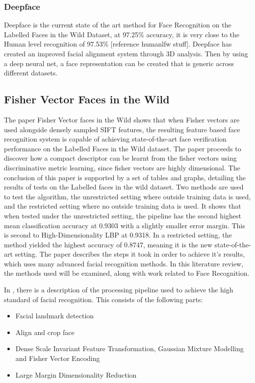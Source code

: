\documentclass[12pt, a4paper]{article}
\begin{document}
\subsubsection{Deepface}
Deepface is the current state of the art method for Face Recognition on the Labelled Faces in the Wild Dataset, at 97.25\% accuracy, it is very close to the Human level recognition of 97.53\% [reference humanlfw stuff]. Deepface has created an improved facial alignment system through 3D analysis. Then by using a deep neural net, a face representation can be created that is generic across different datasets.

\subsection{Fisher Vector Faces in the Wild}
The paper Fisher Vector faces in the Wild \cite{simonyan2004fisher} shows that when Fisher vectors are used alongside densely sampled SIFT features, the resulting feature based face recognition system is capable of achieving state-of-the-art face verification performance on the Labelled Faces in the Wild \cite{labelledFaces} dataset. The paper proceeds to discover how a compact descriptor can be learnt from the fisher vectors using discriminative metric learning, since fisher vectors are highly dimensional. The conclusion of this paper is supported by a set of tables and graphs, detailing the results of tests on the Labelled faces in the wild dataset. Two methods are used to test the algorithm, the unrestricted setting where outside training data is used, and the restricted setting where no outside training data is used. It shows that when tested under the unrestricted setting, the pipeline has the second highest mean classification accuracy at 0.9303 with a slightly smaller error margin. This is second to High-Dimensionality LBP at 0.9318. In a restricted setting, the method yielded the highest accuracy of 0.8747, meaning it is the new state-of-the-art setting. The paper describes the steps it took in order to achieve it’s results, which uses many advanced facial recognition methods. In this literature review, the methods used will be examined, along with work related to Face Recognition.

In \cite{simonyan2004fisher}, there is a description of the processing pipeline used to achieve the high standard of facial recognition. This consists of the following parts:
\begin{itemize}
\item Facial landmark detection
\item Align and crop face
\item Dense Scale Invariant Feature Transformation, Gaussian Mixture Modelling and Fisher Vector Encoding
\item Large Margin Dimensionality Reduction
\end{itemize}
\end{document}
